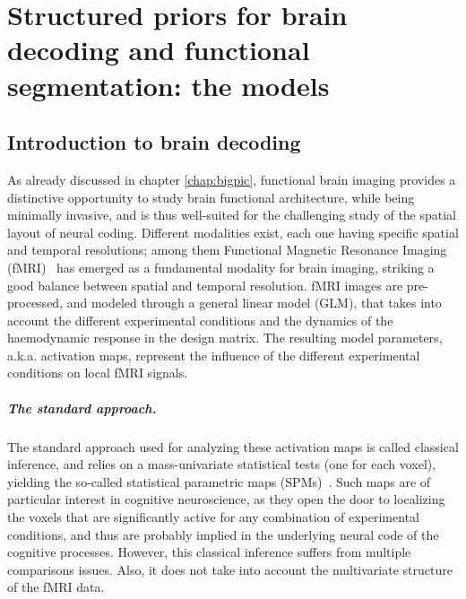 \chapter{Structured priors for brain decoding and functional segmentation: the models}\label{chap:structured_priors}

\minitoc

\section{Introduction to brain decoding}
As already discussed in chapter \ref{chap:bigpic}, functional brain imaging provides a distinctive opportunity to study brain functional architecture, while being minimally invasive, and is thus well-suited for the challenging study of the spatial layout of neural coding. Different modalities exist, each one having specific spatial and temporal resolutions; among them Functional Magnetic Resonance Imaging (fMRI)~\citep{agawa1990,ogawa1990b} has emerged as a fundamental modality for brain imaging, striking a good balance between spatial and temporal resolution.  fMRI images are pre-processed, and modeled through a general linear model (GLM), that takes into account the different experimental conditions and the dynamics of the haemodynamic response in the design matrix. The resulting model parameters, a.k.a. activation maps, represent the influence of the different experimental conditions on local fMRI signals.

\paragraph{The standard approach.}
The standard approach used for analyzing these activation maps is called classical inference, and relies on a mass-univariate statistical tests (one for each voxel), yielding the so-called statistical parametric maps (SPMs)~\citep{friston1994statistical}. Such maps are of particular interest in cognitive neuroscience, as they open the door to localizing the voxels that are significantly active for any combination of experimental conditions, and thus are probably implied in the underlying neural code of the cognitive processes. However, this classical inference suffers from multiple comparisons issues. Also, it does not take into account the multivariate structure of the fMRI data.

